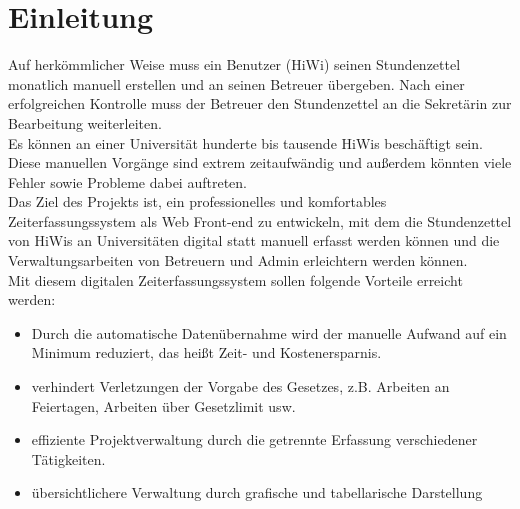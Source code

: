 \section{Einleitung}

Auf herkömmlicher Weise muss ein Benutzer (HiWi) seinen Stundenzettel monatlich manuell erstellen und an seinen Betreuer übergeben. Nach einer erfolgreichen Kontrolle muss der Betreuer den Stundenzettel an die Sekretärin zur Bearbeitung weiterleiten. \\

Es können an einer Universität hunderte bis tausende HiWis beschäftigt sein. Diese manuellen Vorgänge sind extrem zeitaufwändig und außerdem könnten viele Fehler sowie Probleme dabei auftreten.\\

Das Ziel des Projekts ist, ein professionelles und komfortables Zeiterfassungssystem als Web Front-end zu entwickeln, mit dem die Stundenzettel von HiWis an Universitäten digital statt manuell erfasst werden können und die Verwaltungsarbeiten von Betreuern und Admin erleichtern werden können.\\

Mit diesem digitalen Zeiterfassungssystem sollen folgende Vorteile erreicht werden:\\

\begin{itemize}
	\item Durch die automatische Datenübernahme wird der manuelle Aufwand auf ein Minimum reduziert, das heißt Zeit- und Kostenersparnis.
	\item verhindert Verletzungen der Vorgabe des Gesetzes, z.B. Arbeiten an Feiertagen, Arbeiten über Gesetzlimit usw.
	\item effiziente Projektverwaltung durch die getrennte Erfassung verschiedener Tätigkeiten.
	\item übersichtlichere Verwaltung durch grafische und tabellarische Darstellung

\end{itemize}
